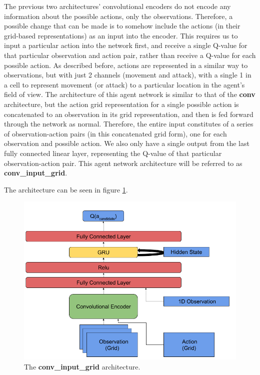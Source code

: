 The previous two architectures’ convolutional encoders do not encode any information about the possible actions, only the observations. Therefore, a possible change that can be made is to somehow include the actions (in their grid-based representations) as an input into the encoder. This requires us to input a particular action into the network first, and receive a single Q-value for that particular observation and action pair, rather than receive a Q-value for each possible action. As described before, actions are represented in a similar way to observations, but with just 2 channels (movement and attack), with a single 1 in a cell to represent movement (or attack) to a particular location in the agent's field of view. The architecture of this agent network is similar to that of the \textbf{conv} architecture, but the action grid representation for a single possible action is concatenated to an observation in its grid representation, and then is fed forward through the network as normal. Therefore, the entire input constitutes of a series of observation-action pairs (in this concatenated grid form), one for each observation and possible action. We also only have a single output from the last fully connected linear layer, representing the Q-value of that particular observation-action pair. This agent network architecture will be referred to as \textbf{conv\_input\_grid}.

The architecture can be seen in figure \ref{fig:conv_input_grid_agent_diagram}.

\begin{figure}
    \centering
    \includegraphics[scale=0.45]{images/agent_diagrams/rnn_conv_ddpg_input_grid_agent_diagram.png}
    \caption{The \textbf{conv\_input\_grid} architecture.}
    \label{fig:conv_input_grid_agent_diagram}
\end{figure}





